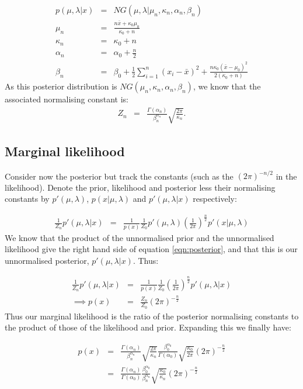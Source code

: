 \documentclass[12pt]{article} %
\begin{document}
	\begin{eqnarray}
	p(\mu, \lambda| x) &=& NG(\mu, \lambda | \mu_n, \kappa_n, \alpha_n, \beta_n) \\
	\mu_n &=& \frac{n\bar{x} + \kappa_0 \mu_0}{\kappa_0 + n} \\
	\kappa_n &=& \kappa_0 + n \\
	\alpha_n &=& \alpha_0 + \frac{n}{2} \\
	\beta_n &=& \beta_0 + \frac{1}{2}\sum_{i=1}^n(x_i - \bar{x})^2 + \frac{n\kappa_0\left(\bar{x} - \mu_0 \right)^2}{2(\kappa_0 + n)}
	\end{eqnarray}
	As this posterior distribution is $NG(\mu_n,\kappa_n, \alpha_n, \beta_n)$, we know that the associated normalising constant is:
	\begin{eqnarray}
	Z_n &=& \frac{\Gamma(\alpha_n)}{\beta_n^{\alpha_n}}\sqrt{\frac{2\pi}{\kappa_n}}.
	\end{eqnarray}
	
	\subsection{Marginal likelihood}
	Consider now the posterior but track the constants (such as the $(2\pi)^{-n/2}$ in the likelihood). Denote the prior, likelihood and posterior less their normalising constants by $p'(\mu, \lambda)$, $p(x | \mu, \lambda)$ and $p'(\mu, \lambda | x)$ respectively:
	
	\begin{eqnarray}
	\frac{1}{Z_n} p'(\mu, \lambda | x) &=& \frac{1}{p(x)}\frac{1}{Z_0} p'(\mu, \lambda)\left(\frac{1}{2\pi}\right)^{\frac{n}{2}} p'(x | \mu, \lambda)
	\end{eqnarray}
	We know that the product of the unnormalised prior and the unnormalised likelihood give the right hand side of equation \ref{eqn:posterior}, and that this is our unnormalised posterior, $p'(\mu, \lambda | x)$. Thus:
	
	\begin{eqnarray}
	\frac{1}{Z_n} p'(\mu, \lambda | x) &=& \frac{1}{p(x)}\frac{1}{Z_0} \left(\frac{1}{2\pi}\right)^{\frac{n}{2}} p'(\mu, \lambda | x) \\
	\implies p(x) &=& \frac{Z_n}{Z_0}(2\pi)^{-\frac{n}{2}} 
	\end{eqnarray}
	Thus our marginal likelihood is the ratio of the posterior normalising constants to the product of those of the likelihood and prior. Expanding this we finally have:
	
	\begin{eqnarray}
	p(x) &=& \frac{\Gamma(\alpha_n)}{\beta_n^{\alpha_n}} \sqrt{\frac{2\pi}{\kappa_n}} \frac{\beta_0^{\alpha_0}}{\Gamma(\alpha_0)} \sqrt{\frac{\kappa_0}{2\pi}} (2\pi)^{-\frac{n}{2}} \\
	&=& \frac{\Gamma(\alpha_n)}{\Gamma(\alpha_0)}\frac{\beta_0^{\alpha_0}}{\beta_n^{\alpha_n}} \sqrt{\frac{\kappa_0}{\kappa_n}}(2\pi)^{-\frac{n}{2}}
	\end{eqnarray}

	
\end{document}
